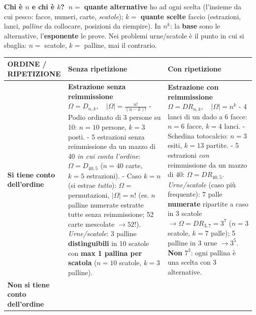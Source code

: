 \documentclass[12pt]{extarticle} %
\begin{document}
\begin{table}[htbp]
\centering
{\footnotesize \textbf{Chi è $n$ e chi è $k$?} $\;n=$ \textbf{quante alternative} ho ad ogni scelta (l'insieme da cui pesco: facce, numeri, carte, \emph{scatole}); $k=$ \textbf{quante scelte} faccio (estrazioni, lanci, \emph{palline} da collocare, posizioni da riempire). In $n^k$: la \textbf{base} sono le alternative, l'\textbf{esponente} le prove. Nei problemi urne/scatole è il punto in cui si sbaglia: $n=$ scatole, $k=$ palline, mai il contrario.}
\vspace{0.15cm}
\renewcommand{\arraystretch}{1.5}
\begin{tabular}{|p{2.2cm}|p{6.4cm}|p{6.4cm}|}
\hline
\textbf{ORDINE / RIPETIZIONE} & \textbf{Senza ripetizione} & \textbf{Con ripetizione} \\
\hline
\textbf{Si tiene conto dell'ordine} &
\textbf{Estrazione senza reimmissione}\newline
$\Omega = D_{n,k}, \quad |\Omega| = \frac{n!}{(n-k)!}$\newline
{\footnotesize
- Podio ordinato di 3 persone su 10: $n=10$ persone, $k=3$ posti.\newline
- 5 estrazioni senza reimmissione da un mazzo di 40 \emph{in cui conta l'ordine}: $\Omega=D_{40,5}$ ($n=40$ carte, $k=5$ estrazioni).\newline
- Caso $k=n$ (si estrae \emph{tutto}): $\Omega=$ permutazioni, $|\Omega|=n!$ (es. $n$ palline numerate estratte tutte senza reimmissione; 52 carte mescolate $\to 52!$).\newline
\textit{Urne/scatole}: 3 palline \textbf{distinguibili} in 10 scatole con \textbf{max 1 pallina per scatola} ($n=10$ scatole, $k=3$ palline).} &
\textbf{Estrazione con reimmissione}\newline
$\Omega = DR_{n,k}, \quad |\Omega| = n^k$\newline
{\footnotesize
- 4 lanci di un dado a 6 facce: $n=6$ facce, $k=4$ lanci.\newline
- Schedina totocalcio: $n=3$ esiti, $k=13$ partite.\newline
- 5 estrazioni \emph{con} reimmissione da un mazzo di 40: $\Omega=DR_{40,5}$.\newline
\textit{Urne/scatole} (caso più frequente): 7 palle \textbf{numerate} ripartite a caso in 3 scatole $\to \Omega=DR_{3,7}=3^7$ ($n=3$ scatole, $k=7$ palle); 5 palline in 3 urne $\to 3^5$. \textbf{Non} $7^3$: ogni pallina è una scelta con 3 alternative.} \\
\hline
\textbf{Non si tiene conto dell'ordine} &

\end{tabular}
\end{table}
\end{document}
